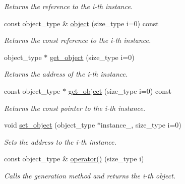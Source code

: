 \begin{DoxyCompactItemize}
\begin{DoxyCompactList}\small\item\em Returns the reference to the i-\/th instance. \end{DoxyCompactList}\item 
\hypertarget{a00368_a60dfb3cc1f04e2f2ae9ac31ed6060a3f}{const object\-\_\-type \& \hyperlink{a00368_a60dfb3cc1f04e2f2ae9ac31ed6060a3f}{object} (size\-\_\-type i=0) const }\label{a00368_a60dfb3cc1f04e2f2ae9ac31ed6060a3f}

\begin{DoxyCompactList}\small\item\em Returns the const reference to the i-\/th instance. \end{DoxyCompactList}\item 
\hypertarget{a00368_a3f4b394c67318d3d895cedaab6bcccb5}{object\-\_\-type $\ast$ \hyperlink{a00368_a3f4b394c67318d3d895cedaab6bcccb5}{get\-\_\-object} (size\-\_\-type i=0)}\label{a00368_a3f4b394c67318d3d895cedaab6bcccb5}

\begin{DoxyCompactList}\small\item\em Returns the address of the i-\/th instance. \end{DoxyCompactList}\item 
\hypertarget{a00368_ae8da1756010b6b49bd7377cb1fd8acdc}{const object\-\_\-type $\ast$ \hyperlink{a00368_ae8da1756010b6b49bd7377cb1fd8acdc}{get\-\_\-object} (size\-\_\-type i=0) const }\label{a00368_ae8da1756010b6b49bd7377cb1fd8acdc}

\begin{DoxyCompactList}\small\item\em Returns the const pointer to the i-\/th instance. \end{DoxyCompactList}\item 
\hypertarget{a00368_ab49eeb4159740c6c3c93d79eaff87b32}{void \hyperlink{a00368_ab49eeb4159740c6c3c93d79eaff87b32}{set\-\_\-object} (object\-\_\-type $\ast$instance\-\_\-, size\-\_\-type i=0)}\label{a00368_ab49eeb4159740c6c3c93d79eaff87b32}

\begin{DoxyCompactList}\small\item\em Sets the address to the i-\/th instance. \end{DoxyCompactList}\item 
\hypertarget{a00368_a35f78745c06de11a83ecbdccc0cd2945}{const object\-\_\-type \& \hyperlink{a00368_a35f78745c06de11a83ecbdccc0cd2945}{operator()} (size\-\_\-type i)}\label{a00368_a35f78745c06de11a83ecbdccc0cd2945}

\begin{DoxyCompactList}\small\item\em Calls the generation method and returns the i-\/th object. \end{DoxyCompactList}\end{DoxyCompactItemize}
